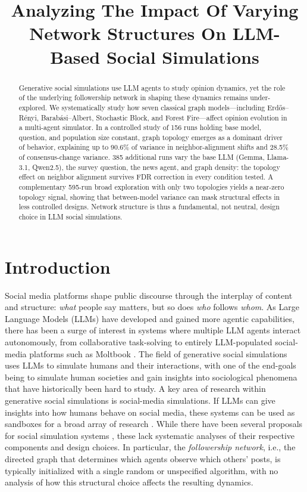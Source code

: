 \documentclass[11pt]{article}
\title{Analyzing The Impact Of Varying Network Structures On LLM-Based Social Simulations}
\begin{document}
\maketitle
\begin{abstract}
  Generative social simulations use LLM agents to study opinion dynamics, yet the role of the underlying followership network in shaping these dynamics remains under-explored. We systematically study how seven classical graph models---including Erd\H{o}s--R\'enyi, Barab\'asi--Albert, Stochastic Block, and Forest Fire---affect opinion evolution in a multi-agent simulator. In a controlled study of 156 runs holding base model, question, and population size constant, graph topology emerges as a dominant driver of behavior, explaining up to 90.6\% of variance in neighbor-alignment shifts and 28.5\% of consensus-change variance. 385 additional runs vary the base LLM (Gemma, Llama-3.1, Qwen2.5), the survey question, the news agent, and graph density: the topology effect on neighbor alignment survives FDR correction in every condition tested. A complementary 595-run broad exploration with only two topologies yields a near-zero topology signal, showing that between-model variance can mask structural effects in less controlled designs. Network structure is thus a fundamental, not neutral, design choice in LLM social simulations.
\end{abstract}

\section{Introduction}

Social media platforms shape public discourse through the interplay of content and structure: \emph{what} people say matters, but so does \emph{who} follows \emph{whom}. As Large Language Models (LLMs) have developed and gained more agentic capabilities, there has been a surge of interest in systems where multiple LLM agents interact autonomously, from collaborative task-solving \cite{luo2025largelanguagemodelagent} to entirely LLM-populated social-media platforms such as Moltbook \cite{li2026riseaiagentcommunities, zhang2026agentswildsafetysociety}. The field of generative social simulations uses LLMs to simulate humans and their interactions, with one of the end-goals being to simulate human societies and gain insights into sociological phenomena that have historically been hard to study. A key area of research within generative social simulations is social-media simulations. If LLMs can give insights into how humans behave on social media, these systems can be used as sandboxes for a broad array of research \cite{piao2025agentsocietylargescalesimulationllmdriven}. While there have been several proposals for social simulation systems \cite{touzel2024simulationsolvingsocietalscalemanipulation,yang2025oasisopenagentsocial, piao2025agentsocietylargescalesimulationllmdriven}, these lack systematic analyses of their respective components and design choices. In particular, the \emph{followership network}, i.e., the directed graph that determines which agents observe which others' posts, is typically initialized with a single random or unspecified algorithm, with no analysis of how this structural choice affects the resulting dynamics.
\end{document}
